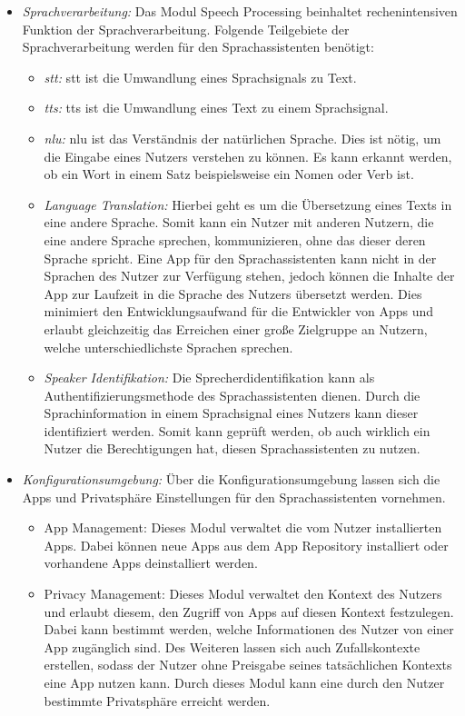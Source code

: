 \begin{itemize}
	\item \textsl{Sprachverarbeitung:} Das Modul Speech Processing beinhaltet rechenintensiven Funktion der Sprachverarbeitung. Folgende Teilgebiete der Sprachverarbeitung werden für den Sprachassistenten benötigt:
	\begin{itemize}
		\item \textsl{\ac{stt}:} \ac{stt} ist die Umwandlung eines Sprachsignals zu Text.
		\item \textsl{\ac{tts}:} \ac{tts} ist die Umwandlung eines Text zu einem Sprachsignal.
		\item \textsl{\ac{nlu}:} \ac{nlu} ist das Verständnis der natürlichen Sprache. Dies ist nötig, um die Eingabe eines Nutzers verstehen zu können. Es kann erkannt werden, ob ein Wort in einem Satz beispielsweise ein Nomen oder Verb ist. 
		\item \textsl{Language Translation:} Hierbei geht es um die Übersetzung eines Texts in eine andere Sprache. Somit kann ein Nutzer mit anderen Nutzern, die eine andere Sprache sprechen, kommunizieren, ohne das dieser deren Sprache spricht. Eine App für den Sprachassistenten kann nicht in der Sprachen des Nutzer zur Verfügung stehen, jedoch können die Inhalte der App  zur Laufzeit in die Sprache des Nutzers übersetzt werden. Dies minimiert den Entwicklungsaufwand für die Entwickler von Apps und erlaubt gleichzeitig das Erreichen einer große Zielgruppe an Nutzern, welche unterschiedlichste Sprachen sprechen. 
		\item \textsl{Speaker Identifikation:} Die Sprecherdidentifikation kann als Authentifizierungsmethode des Sprachassistenten dienen. Durch die Sprachinformation in einem Sprachsignal eines Nutzers kann dieser identifiziert werden. Somit kann geprüft werden, ob auch wirklich ein Nutzer die Berechtigungen hat, diesen Sprachassistenten zu nutzen.
	\end{itemize}
	\item \textsl{Konfigurationsumgebung:} Über die Konfigurationsumgebung lassen sich die Apps und Privatsphäre Einstellungen für den Sprachassistenten vornehmen.
	\begin{itemize}
		\item App Management: Dieses Modul verwaltet die vom Nutzer installierten Apps. Dabei können neue Apps aus dem App Repository installiert oder vorhandene Apps deinstalliert werden.
		\item Privacy Management: Dieses Modul verwaltet den Kontext des Nutzers und erlaubt diesem, den Zugriff von Apps auf diesen Kontext festzulegen. Dabei kann bestimmt werden, welche Informationen des Nutzer von einer App zugänglich sind. Des Weiteren lassen sich auch Zufallskontexte erstellen, sodass der Nutzer ohne Preisgabe seines tatsächlichen Kontexts eine App nutzen kann. Durch dieses Modul kann eine durch den Nutzer bestimmte Privatsphäre erreicht werden. 
	\end{itemize}	
\end{itemize}





